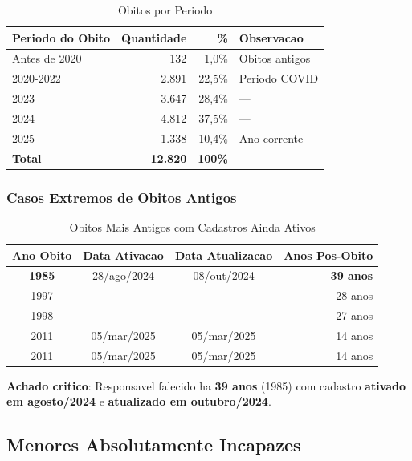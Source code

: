 \documentclass[11pt,a4paper]{article}
\begin{document}
\begin{table}[H]
\centering
\caption{Obitos por Periodo}
\label{tab:obitos}
\begin{tabular}{lrrl}
\toprule
\textbf{Periodo do Obito} & \textbf{Quantidade} & \textbf{\%} & \textbf{Observacao} \\
\midrule
Antes de 2020 & 132 & 1,0\% & Obitos antigos \\
2020-2022 & 2.891 & 22,5\% & Periodo COVID \\
2023 & 3.647 & 28,4\% & --- \\
2024 & 4.812 & 37,5\% & --- \\
2025 & 1.338 & 10,4\% & Ano corrente \\
\midrule
\textbf{Total} & \textbf{12.820} & \textbf{100\%} & --- \\
\bottomrule
\end{tabular}
\end{table}

\subsubsection{Casos Extremos de Obitos Antigos}

\begin{table}[H]
\centering
\caption{Obitos Mais Antigos com Cadastros Ainda Ativos}
\label{tab:obitos_antigos}
\begin{tabular}{cccr}
\toprule
\textbf{Ano Obito} & \textbf{Data Ativacao} & \textbf{Data Atualizacao} & \textbf{Anos Pos-Obito} \\
\midrule
\textbf{1985} & 28/ago/2024 & 08/out/2024 & \textbf{39 anos} \\
1997 & --- & --- & 28 anos \\
1998 & --- & --- & 27 anos \\
2011 & 05/mar/2025 & 05/mar/2025 & 14 anos \\
2011 & 05/mar/2025 & 05/mar/2025 & 14 anos \\
\bottomrule
\end{tabular}
\end{table}

\textbf{Achado critico}: Responsavel falecido ha \textbf{39 anos} (1985) com cadastro
\textbf{ativado em agosto/2024} e \textbf{atualizado em outubro/2024}.


\subsection{Menores Absolutamente Incapazes}
\end{document}

